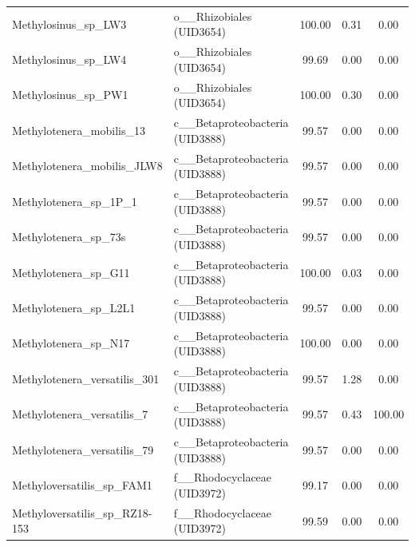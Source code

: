 \begin{landscape}
\begin{singlespace}
\begin{longtable}{p{} p{} ccc}
                  Methylosinus\_sp\_LW3 &          o\_\_Rhizobiales (UID3654) &        100.00 &           0.31 &                  0.00 \\
                  Methylosinus\_sp\_LW4 &          o\_\_Rhizobiales (UID3654) &         99.69 &           0.00 &                  0.00 \\
                  Methylosinus\_sp\_PW1 &          o\_\_Rhizobiales (UID3654) &        100.00 &           0.30 &                  0.00 \\
             Methylotenera\_mobilis\_13 &   c\_\_Betaproteobacteria (UID3888) &         99.57 &           0.00 &                  0.00 \\
           Methylotenera\_mobilis\_JLW8 &   c\_\_Betaproteobacteria (UID3888) &         99.57 &           0.00 &                  0.00 \\
                Methylotenera\_sp\_1P\_1 &   c\_\_Betaproteobacteria (UID3888) &         99.57 &           0.00 &                  0.00 \\
                 Methylotenera\_sp\_73s &   c\_\_Betaproteobacteria (UID3888) &         99.57 &           0.00 &                  0.00 \\
                 Methylotenera\_sp\_G11 &   c\_\_Betaproteobacteria (UID3888) &        100.00 &           0.03 &                  0.00 \\
                Methylotenera\_sp\_L2L1 &   c\_\_Betaproteobacteria (UID3888) &         99.57 &           0.00 &                  0.00 \\
                 Methylotenera\_sp\_N17 &   c\_\_Betaproteobacteria (UID3888) &        100.00 &           0.00 &                  0.00 \\
         Methylotenera\_versatilis\_301 &   c\_\_Betaproteobacteria (UID3888) &         99.57 &           1.28 &                  0.00 \\
           Methylotenera\_versatilis\_7 &   c\_\_Betaproteobacteria (UID3888) &         99.57 &           0.43 &                100.00 \\
          Methylotenera\_versatilis\_79 &   c\_\_Betaproteobacteria (UID3888) &         99.57 &           0.00 &                  0.00 \\
            Methyloversatilis\_sp\_FAM1 &       f\_\_Rhodocyclaceae (UID3972) &         99.17 &           0.00 &                  0.00 \\
        Methyloversatilis\_sp\_RZ18-153 &       f\_\_Rhodocyclaceae (UID3972) &         99.59 &           0.00 &                  0.00 \\

\end{longtable}
\end{singlespace}
\end{landscape}
